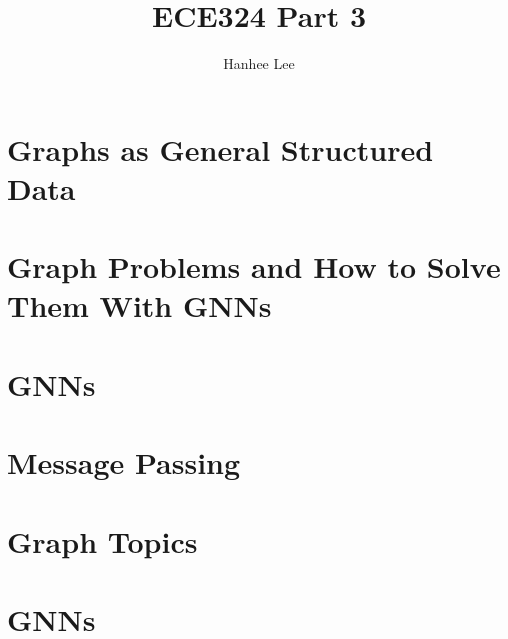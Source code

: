 \documentclass{article}
\title{ECE324 Part 3}
\author{Hanhee Lee}
\begin{document}
\section{Graphs as General Structured Data}

\newpage

\section{Graph Problems and How to Solve Them With GNNs}

\newpage

\section{GNNs}

\newpage

\section{Message Passing}

\newpage

\section{Graph Topics}

\newpage

\section{GNNs}

\end{document}
